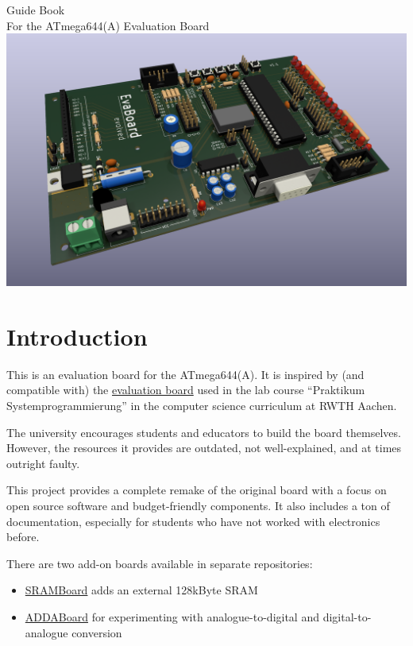\documentclass{article}
\begin{document}
\hypersetup{pageanchor=false}
\begin{titlepage}
\thispagestyle{empty}
\centering
\textsf{\Huge Guide Book}\\[1cm]
\textsf{\Large For the ATmega644(A) Evaluation Board}\\[3cm]
\includegraphics[width=\textwidth]{Pictures/EvaBoard3DRender.png}
\end{titlepage}
\hypersetup{pageanchor=true}

\tableofcontents
\section{Introduction}
This is an evaluation board for the ATmega644(A). It is inspired by (and compatible with) the \href{https://www.embedded.rwth-aachen.de/doku.php?id=lehre:atmegaevaboard}{evaluation board} used in the lab course ``Praktikum Systemprogrammierung'' in the computer science curriculum at RWTH Aachen. 

The university encourages students and educators to build the board themselves. However, the resources it provides are outdated, not well-explained, and at times outright faulty. 

This project provides a complete remake of the original board with a focus on open source software and budget-friendly components. It also includes a ton of documentation, especially for students who have not worked with electronics before. 

There are two add-on boards available in separate repositories:

\begin{itemize}
	\item \href{https://github.com/7vgn/SRAMBoard/}{SRAMBoard} adds an external 128kByte SRAM
	\item \href{https://github.com/7vgn/ADDABoard/}{ADDABoard} for experimenting with analogue-to-digital and digital-to-analogue conversion
\end{itemize}
\end{document}
